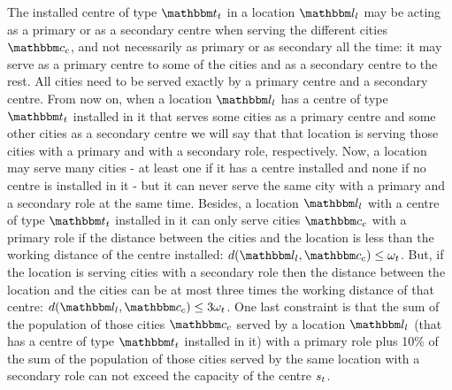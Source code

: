The installed centre of type $\ecentre_\icentre$ in a location $\eloc_\iloc$ may be acting as a
primary or as a secondary centre when serving the different cities $\ecity_\icity$, and not
necessarily as primary or as secondary all the time: it may serve as a primary centre to some
of the cities and as a secondary centre to the rest. All cities need to be served exactly by
a primary centre and a secondary centre. From now on, when a location $\eloc_\iloc$ has a
centre of type $\ecentre_\icentre$ installed in it that serves some cities as a primary centre
and some other cities as a secondary centre we will say that that location is serving those
cities with a primary and with a secondary role, respectively. Now, a location may serve many
cities - at least one if it has a centre installed and none if no centre is installed in it -
but it can never serve the same city with a primary and a secondary role at the same time.
Besides, a location $\eloc_\iloc$ with a centre of type $\ecentre_\icentre$ installed in it
can only serve cities $\ecity_\icity$ with a primary role if the distance between the cities
and the location is less than the working distance of the centre installed: $d(\eloc_\iloc,
\ecity_\icity) \le \omega_\icentre$. But, if the location is serving cities with a secondary
role then the distance between the location and the cities can be at most three times the
working distance of that centre: $d(\eloc_\iloc, \ecity_\icity) \le 3\omega_\icentre$. One last
constraint is that the sum of the population of those cities $\ecity_\icity$ served by a
location $\eloc_\iloc$ (that has a centre of type $\ecentre_\icentre$ installed in it) with a
primary role plus 10\% of the sum of the population of those cities served by the same
location with a secondary role can not exceed the capacity of the centre $s_t$.

